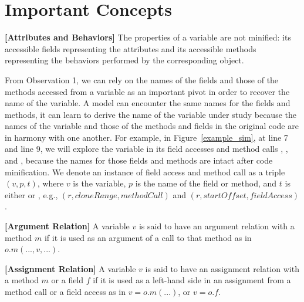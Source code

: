 \section{Important Concepts}
\label{concepts:sec}

\begin{definition}{\bf [Attributes and Behaviors]}
The properties of a variable are not minified: its accessible fields
representing the attributes and its accessible methods representing
the behaviors performed by the corresponding object.
\end{definition}

From Observation 1, we can rely on the names of the fields and those
of the methods accessed from a variable as an important pivot in order
to recover the name of the variable. A model can encounter the same
names for the fields and methods, it can learn to derive the name of
the variable under study because the names of the variable and those
of the methods and fields in the original code are in harmony with one
another. For example, in Figure~\ref{example_sim}, at line 7 and line
9, we will explore the variable  in its field accesses and
method calls , , and
, because the names for those fields and methods are
intact after code minification. We denote an instance of field access
and method call as a triple $(v, p, t)$, where $v$ is the variable,
$p$ is the name of the field or method, and $t$ is either
 or , e.g., $(r, cloneRange,
methodCall)$ and $(r, startOffset, fieldAccess)$.



\begin{definition}{\bf [Argument Relation]}
  A variable $v$ is said to have an argument relation with a method
  $m$ if it is used as an argument of a call to that method as in
  $o.m(...,v,...)$.
\end{definition}

\begin{definition}{\bf [Assignment Relation]}
  A variable $v$ is said to have an assignment relation with a method
  $m$ or a field $f$ if it is used as a left-hand side in an
  assignment from a method call or a field access as in $v =
  o.m(...)$, or $v = o.f$.
\end{definition}


%
%

